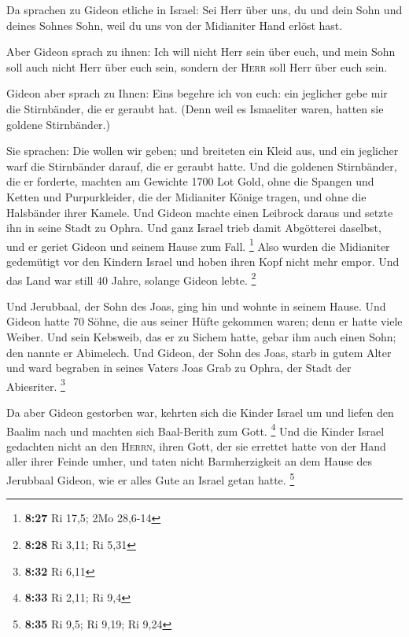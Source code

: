  Da sprachen zu Gideon etliche in Israel: Sei Herr über
uns, du und dein Sohn und deines Sohnes Sohn, weil du uns von der
Midianiter Hand erlöst hast.

 Aber Gideon sprach zu ihnen: Ich will nicht Herr sein
über euch, und mein Sohn soll auch nicht Herr über euch sein, sondern
der \textsc{Herr} soll Herr über euch sein.

 Gideon aber sprach zu Ihnen: Eins begehre ich von euch:
ein jeglicher gebe mir die Stirnbänder, die er geraubt hat. (Denn weil
es Ismaeliter waren, hatten sie goldene Stirnbänder.)

 Sie sprachen: Die wollen wir geben; und breiteten ein
Kleid aus, und ein jeglicher warf die Stirnbänder darauf, die er geraubt
hatte.  Und die goldenen Stirnbänder, die er forderte,
machten am Gewichte 1700 Lot Gold, ohne die Spangen und Ketten und
Purpurkleider, die der Midianiter Könige tragen, und ohne die Halsbänder
ihrer Kamele.  Und Gideon machte einen Leibrock daraus
und setzte ihn in seine Stadt zu Ophra. Und ganz Israel trieb damit
Abgötterei daselbst, und er geriet Gideon und seinem Hause zum Fall.
\footnote{\textbf{8:27} Ri 17,5; 2Mo 28,6-14}  Also
wurden die Midianiter gedemütigt vor den Kindern Israel und hoben ihren
Kopf nicht mehr empor. Und das Land war still 40 Jahre, solange Gideon
lebte. \footnote{\textbf{8:28} Ri 3,11; Ri 5,31}

 Und Jerubbaal, der Sohn des Joas, ging hin und wohnte in
seinem Hause.  Und Gideon hatte 70 Söhne, die aus seiner
Hüfte gekommen waren; denn er hatte viele Weiber.  Und
sein Kebsweib, das er zu Sichem hatte, gebar ihm auch einen Sohn; den
nannte er Abimelech.  Und Gideon, der Sohn des Joas,
starb in gutem Alter und ward begraben in seines Vaters Joas Grab zu
Ophra, der Stadt der Abiesriter. \footnote{\textbf{8:32} Ri 6,11}

 Da aber Gideon gestorben war, kehrten sich die Kinder
Israel um und liefen den Baalim nach und machten sich Baal-Berith zum
Gott. \footnote{\textbf{8:33} Ri 2,11; Ri 9,4}  Und die
Kinder Israel gedachten nicht an den \textsc{Herrn}, ihren Gott, der sie
errettet hatte von der Hand aller ihrer Feinde umher, 
und taten nicht Barmherzigkeit an dem Hause des Jerubbaal Gideon, wie er
alles Gute an Israel getan hatte. \footnote{\textbf{8:35} Ri 9,5; Ri
  9,19; Ri 9,24}

